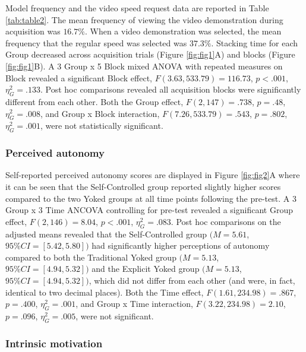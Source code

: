 \documentclass[
  english,
  jou]{apa7}
\begin{document}
Model frequency and the video speed request data are reported in Table \ref{tab:table2}. The mean frequency of viewing the video demonstration during acquisition was \(16.7\%\). When a video demonstration was selected, the mean frequency that the regular speed was selected was \(37.3\%\). Stacking time for each Group decreased across acquisition trials (Figure \ref{fig:fig1}A) and blocks (Figure \ref{fig:fig1}B). A 3 Group x 5 Block mixed ANOVA with repeated measures on Block revealed a significant Block effect, \(F(3.63,533.79) = 116.73\), \(p < .001\), \(\eta^2_{G} = .133\). Post hoc comparisons revealed all acquisition blocks were significantly different from each other. Both the Group effect, \(F(2,147) = .738\), \(p = .48\), \(\eta^2_{G} = .008\), and Group x Block interaction, \(F(7.26,533.79) = .543\), \(p = .802\), \(\eta^2_{G} = .001\), were not statistically significant.

\hypertarget{perceived-autonomy}{%
\subsubsection{Perceived autonomy}\label{perceived-autonomy}}

Self-reported perceived autonomy scores are displayed in Figure \ref{fig:fig2}A where it can be seen that the Self-Controlled group reported slightly higher scores compared to the two Yoked groups at all time points following the pre-test. A 3 Group x 3 Time ANCOVA controlling for pre-test revealed a significant Group effect, \(F(2,146) = 8.04\), \(p < .001\), \(\eta^2_{G} = .083.\) Post hoc comparisons on the adjusted means revealed that the Self-Controlled group \((M = 5.61\), \(95\%CI =[5.42,5.80])\) had significantly higher perceptions of autonomy compared to both the Traditional Yoked group \((M = 5.13\), \(95\%CI = [4.94,5.32])\) and the Explicit Yoked group \((M = 5.13\), \(95\%CI = [4.94,5.32])\), which did not differ from each other (and were, in fact, identical to two decimal places). Both the Time effect, \(F(1.61,234.98) = .867\), \(p = .400\), \(\eta^2_{G} = .001\), and Group x Time interaction, \(F(3.22,234.98) = 2.10\), \(p = .096\), \(\eta^2_{G} = .005\), were not significant.



\hypertarget{intrinsic-motivation}{%
\subsubsection{Intrinsic motivation}\label{intrinsic-motivation}}
\end{document}
